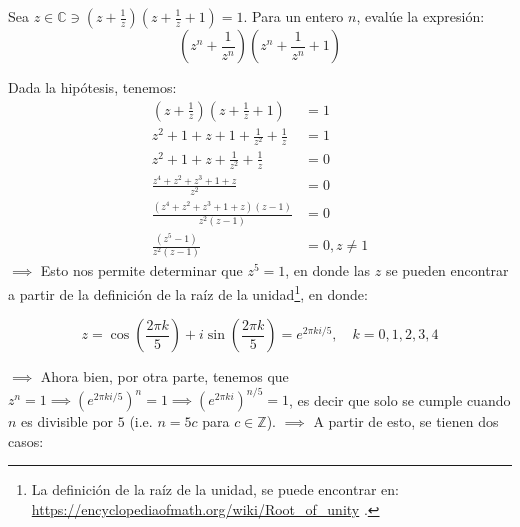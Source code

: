 \begin{problema}
    Sea $z \in \mathbb{C} \ni\left(z+\frac{1}{z}\right)\left(z+\frac{1}{z}+1\right)=1$. Para un entero $n$, evalúe la expresión:
    $$\left(z^{n}+\frac{1}{z^{n}}\right)\left(z^{n}+\frac{1}{z^{n}}+1\right)$$

    \begin{sol}
        Dada la hipótesis, tenemos: 
        \begin{align*}
            \left(z+\frac{1}{z}\right)\left(z+\frac{1}{z}+1\right) & = 1\\
            z^2+1+z+1+\frac{1}{z^2} + \frac{1}{z} &= 1 \\
            z^2+1+z+\frac{1}{z^2} + \frac{1}{z} &= 0 \\
            \frac{z^4+z^2+z^3+1+z}{z^2}&= 0\\
            \frac{(z^4+z^2+z^3+1+z)(z-1)}{z^2(z-1)}&= 0\\
            \frac{(z^5-1)}{z^2(z-1)}&= 0,z\neq 1
        \end{align*}
        $\implies$ Esto nos permite determinar que $z^5=1$, en donde las $z$ se pueden encontrar a partir de la definición de la raíz de la unidad\footnote{ La definición de la raíz de la unidad, se puede encontrar en: \href{https://encyclopediaofmath.org/wiki/Root_of_unity}{https://encyclopediaofmath.org/wiki/Root\_of\_unity} .}, en donde: 

        $$z = \cos\left(\frac{2\pi k}{5}\right)+ i \sin \left(\frac{2\pi k}{5}\right) = e^{2\pi ki/5}, \quad k=0,1,2,3,4$$

        $\implies$ Ahora bien, por otra parte, tenemos que $z^n =1\implies \left(e^{2\pi ki/5}\right)^n=1\implies\left(e^{2\pi ki}\right)^{n/5}=1 $, es decir que solo se cumple cuando $n$ es divisible por $5$ (i.e. $n=5c$ para $c \in\mathbb{Z}$). $\implies$ A partir de esto, se tienen dos casos: 


\end{sol}
\end{problema}
